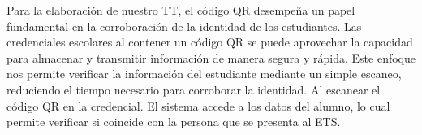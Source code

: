 Para la elaboración de nuestro TT, el código QR desempeña un papel fundamental en la corroboración de la identidad de los estudiantes. Las credenciales escolares al contener un código QR se puede aprovechar la capacidad para almacenar y transmitir información de manera segura y rápida. Este enfoque nos permite verificar la información del estudiante mediante un simple escaneo, reduciendo el tiempo necesario para corroborar la identidad. Al escanear el código QR en la credencial. El sistema accede a los datos del alumno, lo cual permite verificar si coincide con la persona que se presenta al ETS.